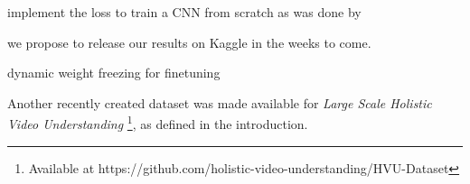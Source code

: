 implement the loss to train a CNN from scratch as was done by \cite{tencent}

we propose to release our results on Kaggle in the weeks to come.

dynamic weight freezing for finetuning~\cite{ULMFit}

Another recently created dataset was made available for \emph{Large Scale Holistic Video Understanding} \cite{holisticVideoData}\footnote{Available at https://github.com/holistic-video-understanding/HVU-Dataset}, as defined in the introduction.


